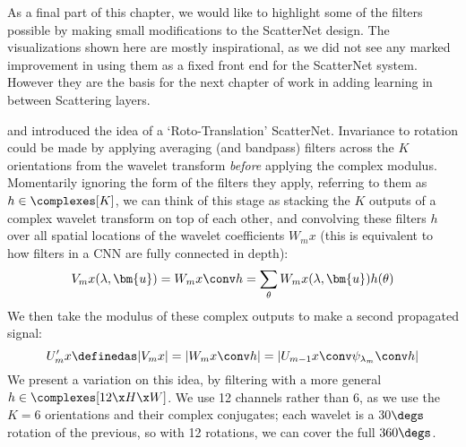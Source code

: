 As a final part of this chapter, we would like to highlight some of the filters 
possible by making small modifications to the ScatterNet design. The
visualizations shown here are mostly inspirational, as we did not see any marked
improvement in using them as a fixed front end for the ScatterNet system.
However they are the basis for the next chapter of work in adding learning in
between Scattering layers.

\cite{sifre_rotation_2013} and \cite{oyallon_deep_2015} introduced the idea of
a `Roto-Translation' ScatterNet. Invariance to rotation could be made by
applying averaging (and bandpass) filters across the $K$ orientations 
from the wavelet transform \emph{before} applying the complex modulus.
Momentarily ignoring the form of the filters they apply, referring to them
as $h\in \complexes[K]$, we can think of this stage as stacking the $K$
outputs of a complex wavelet transform on top of each other, and convolving
these filters $h$ over all spatial locations of the wavelet coefficients $W_m
x$ (this is equivalent to how filters in a CNN are fully connected
in depth):
\begin{equation}
  V_m x(\lambda, \bm{u}) = W_{m}x \conv h = \sum_{\theta} W_{m}x(\lambda, \bm{u})
h(\theta)
\end{equation}
We then take the modulus of these complex outputs to make a second propagated
signal:
\begin{equation}
  U_{m}'x \definedas |V_{m}x| = |W_{m}x \conv h| = |U_{m-1}x
  \conv \psi_{\lambda_{m}} \conv h|
\end{equation}
We present a variation on this idea, by filtering with a more general 
$h\in \complexes[12\x H\x W]$. We use 12 channels rather than 6, as we use
the $K=6$ orientations and their complex conjugates; each wavelet is a 30$\degs$
rotation of the previous, so with 12 rotations, we can cover the full
$360\degs$. 

